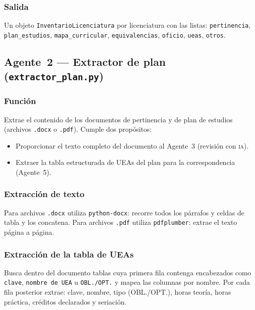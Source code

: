 \documentclass[11pt,a4paper]{article}
\newcommand{\IA}{\textsc{ia}}
\begin{document}
\subsubsection{Salida}

Un objeto \texttt{InventarioLicenciatura} por licenciatura con las listas:
\texttt{pertinencia}, \texttt{plan\_estudios}, \texttt{mapa\_curricular},
\texttt{equivalencias}, \texttt{oficio}, \texttt{ueas}, \texttt{otros}.

\subsection{Agente~2 --- Extractor de plan (\texttt{extractor\_plan.py})}

\subsubsection{Función}

Extrae el contenido de los documentos de pertinencia y de plan de estudios
(archivos \texttt{.docx} o \texttt{.pdf}). Cumple dos propósitos:

\begin{itemize}[nosep]
  \item Proporcionar el texto completo del documento al Agente~3 (revisión con \IA{}).
  \item Extraer la tabla estructurada de UEAs del plan para la correspondencia (Agente~5).
\end{itemize}

\subsubsection{Extracción de texto}

Para archivos \texttt{.docx} utiliza \texttt{python-docx}: recorre todos los párrafos y
celdas de tabla y los concatena. Para archivos \texttt{.pdf} utiliza \texttt{pdfplumber}:
extrae el texto página a página.

\subsubsection{Extracción de la tabla de UEAs}

Busca dentro del documento tablas cuya primera fila contenga encabezados como
\texttt{clave}, \texttt{nombre de UEA} u \texttt{OBL./OPT.} y mapea las columnas por
nombre. Por cada fila posterior extrae: clave, nombre, tipo (OBL./OPT.),
horas teoría, horas práctica, créditos declarados y seriación.
\end{document}
